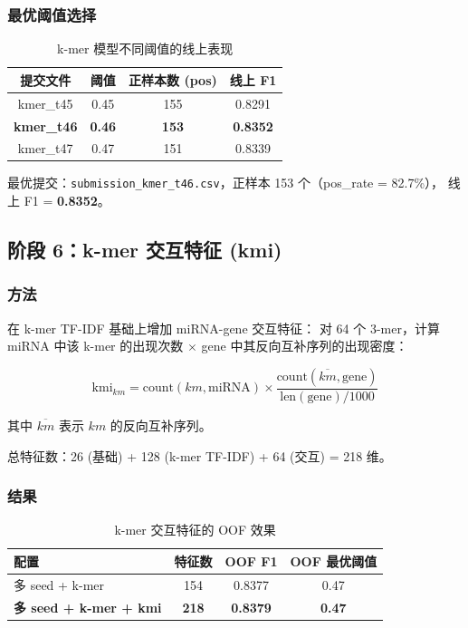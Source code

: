 \documentclass[11pt,a4paper]{article}
\begin{document}
\subsubsection{最优阈值选择}

\begin{table}[H]
\centering
\caption{k-mer 模型不同阈值的线上表现}
\begin{tabular}{cccc}
\toprule
提交文件 & 阈值 & 正样本数 (pos) & 线上 F1 \\
\midrule
kmer\_t45 & 0.45 & 155 & 0.8291 \\
\textbf{kmer\_t46} & \textbf{0.46} & \textbf{153} & \textbf{0.8352} \\
kmer\_t47 & 0.47 & 151 & 0.8339 \\
\bottomrule
\end{tabular}
\end{table}

最优提交：\texttt{submission\_kmer\_t46.csv}，正样本 153 个（pos\_rate = 82.7\%），
线上 F1 = \textbf{0.8352}。

\subsection{阶段 6：k-mer 交互特征 (kmi)}

\subsubsection{方法}

在 k-mer TF-IDF 基础上增加 miRNA-gene 交互特征：
对 64 个 3-mer，计算 miRNA 中该 k-mer 的出现次数 $\times$ gene 中其反向互补序列的出现密度：

\[
\text{kmi}_{km} = \text{count}(km, \text{miRNA}) \times \frac{\text{count}(\overline{km}, \text{gene})}{\text{len}(\text{gene}) / 1000}
\]

其中 $\overline{km}$ 表示 $km$ 的反向互补序列。

总特征数：26 (基础) + 128 (k-mer TF-IDF) + 64 (交互) = 218 维。

\subsubsection{结果}

\begin{table}[H]
\centering
\caption{k-mer 交互特征的 OOF 效果}
\begin{tabular}{lccc}
\toprule
配置 & 特征数 & OOF F1 & OOF 最优阈值 \\
\midrule
多 seed + k-mer & 154 & 0.8377 & 0.47 \\
\textbf{多 seed + k-mer + kmi} & \textbf{218} & \textbf{0.8379} & \textbf{0.47} \\
\bottomrule
\end{tabular}
\end{table}
\end{document}
